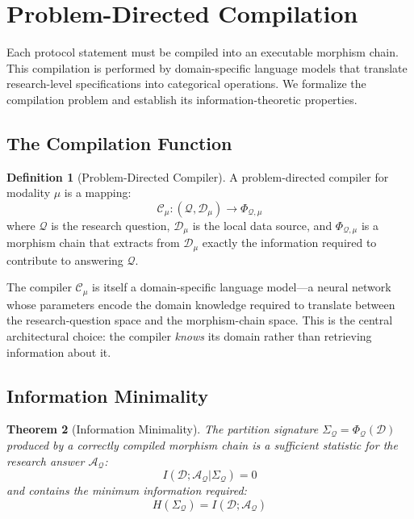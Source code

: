 \documentclass[10pt,twocolumn]{article}
\newtheorem{theorem}{Theorem}[section]
\theoremstyle{definition}
\newtheorem{definition}[theorem]{Definition}
\theoremstyle{remark}
\newcommand{\morphism}{\Phi}
\newcommand{\question}{\mathcal{Q}}
\newcommand{\answer}{\mathcal{A}}
\newcommand{\dataset}{\mathcal{D}}
\begin{document}
\section{Problem-Directed Compilation}
\label{sec:compilation}

Each protocol statement must be compiled into an executable morphism chain. This compilation is performed by domain-specific language models that translate research-level specifications into categorical operations. We formalize the compilation problem and establish its information-theoretic properties.

\subsection{The Compilation Function}

\begin{definition}[Problem-Directed Compiler]
\label{def:compiler}
A problem-directed compiler for modality $\mu$ is a mapping:
\begin{equation}
\mathcal{C}_\mu : (\question, \dataset_\mu) \to \morphism_{\question, \mu}
\end{equation}
where $\question$ is the research question, $\dataset_\mu$ is the local data source, and $\morphism_{\question, \mu}$ is a morphism chain that extracts from $\dataset_\mu$ exactly the information required to contribute to answering $\question$.
\end{definition}

The compiler $\mathcal{C}_\mu$ is itself a domain-specific language model---a neural network whose parameters encode the domain knowledge required to translate between the research-question space and the morphism-chain space. This is the central architectural choice: the compiler \emph{knows} its domain rather than retrieving information about it.

\subsection{Information Minimality}

\begin{theorem}[Information Minimality]
\label{thm:minimality}
The partition signature $\Sigma_\question = \morphism_{\question}(\dataset)$ produced by a correctly compiled morphism chain is a sufficient statistic for the research answer $\answer_\question$:
\begin{equation}
I(\dataset; \answer_\question | \Sigma_\question) = 0
\end{equation}
and contains the minimum information required:
\begin{equation}
H(\Sigma_\question) = I(\dataset; \answer_\question)
\end{equation}
\end{theorem}
\end{document}
